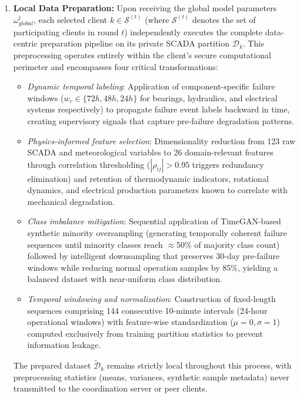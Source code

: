 \documentclass[12pt]{article}
\begin{document}
\begin{enumerate}
    \item \textbf{Local Data Preparation:} 
    Upon receiving the global model parameters $\omega_{global}^{t}$, each selected client $k \in \mathcal{S}^{(t)}$ (where $\mathcal{S}^{(t)}$ denotes the set of participating clients in round $t$) independently executes the complete data-centric preparation pipeline on its private SCADA partition $\mathcal{D}_k$. This preprocessing operates entirely within the client's secure computational perimeter and encompasses four critical transformations:
    
    \begin{itemize}
        \item \textit{Dynamic temporal labeling}: Application of component-specific failure windows ($w_c \in \{72h, 48h, 24h\}$ for bearings, hydraulics, and electrical systems respectively) to propagate failure event labels backward in time, creating supervisory signals that capture pre-failure degradation patterns.
        
        \item \textit{Physics-informed feature selection}: Dimensionality reduction from 123 raw SCADA and meteorological variables to 26 domain-relevant features through correlation thresholding ($|\rho_{ij}| > 0.95$ triggers redundancy elimination) and retention of thermodynamic indicators, rotational dynamics, and electrical production parameters known to correlate with mechanical degradation.
        
        \item \textit{Class imbalance mitigation}: Sequential application of TimeGAN-based synthetic minority oversampling (generating temporally coherent failure sequences until minority classes reach $\approx$50\% of majority class count) followed by intelligent downsampling that preserves 30-day pre-failure windows while reducing normal operation samples by 85\%, yielding a balanced dataset with near-uniform class distribution.
        
        \item \textit{Temporal windowing and normalization}: Construction of fixed-length sequences comprising 144 consecutive 10-minute intervals (24-hour operational windows) with feature-wise standardization ($\mu=0, \sigma=1$) computed exclusively from training partition statistics to prevent information leakage.
    \end{itemize}
    
    The prepared dataset $\tilde{\mathcal{D}}_k$ remains strictly local throughout this process, with preprocessing statistics (means, variances, synthetic sample metadata) never transmitted to the coordination server or peer clients.
    

\end{enumerate}
\end{document}
